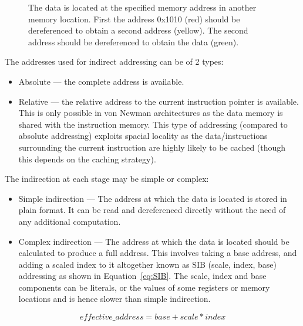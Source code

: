 \documentclass{report}
\begin{document}
\begin{figure}[H]
\caption{The data is located at the specified memory address in another memory
location. First the address 0x1010 (red) should be dereferenced to obtain a
second address (yellow). The second address should be dereferenced to obtain
the data (green).}\label{fig:multi-level-indirection}
\end{figure}

The addresses used for indirect addressing can be of 2 types:

\begin{itemize}
    \item{Absolute --- the complete address is available. }
    \item{Relative --- the relative address to the current instruction pointer
is available. This is only possible in von Newman architectures as the data
memory is shared with the instruction memory. This type of addressing (compared
to absolute addressing) exploits spacial locality as the data/instructions
surrounding the current instruction are highly likely to be cached (though this
depends on the caching strategy). } \end{itemize}

The indirection at each stage may be simple or complex:

\begin{itemize}
    \item{Simple indirection --- The address at which the data is located is
        stored in plain format. It can be read and dereferenced directly
        without the need of any additional computation. }
    \item{Complex indirection --- The address at which the data is located
        should be calculated to produce a full address. This involves taking a
        base address, and adding a scaled index to it altogether known as SIB
        (scale, index, base) addressing as shown in Equation~\ref{eq:SIB}. The
        scale, index and base components can be literals, or the values of some
        registers or memory locations and is hence slower than simple
        indirection.}
\end{itemize}

\begin{equation}
    \label{eq:SIB}
    effective\_address = base + scale * index
\end{equation}
\end{document}
